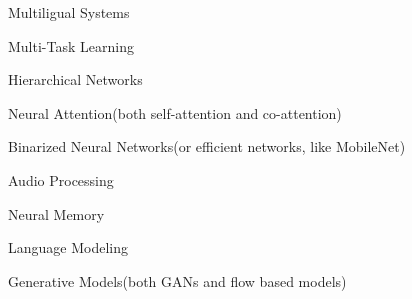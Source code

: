 

\begin{cventries}

\vspace{5mm}

  \begin{cvitems} %
  	\item {Multiligual Systems}
  	\item {Multi-Task Learning}
  	\item {Hierarchical Networks}
  	\item {Neural Attention(both self-attention and co-attention)}
    \item {Binarized Neural Networks(or efficient networks, like MobileNet)}
    \item {Audio Processing}
    \item {Neural Memory}
    \item {Language Modeling}
    \item {Generative Models(both GANs and flow based models)}
   \end{cvitems}
    
\end{cventries}
